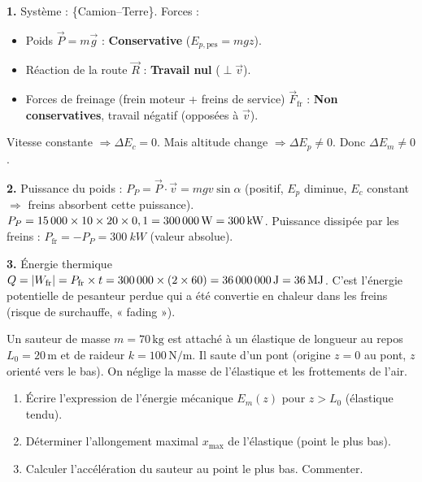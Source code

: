 \documentclass[11pt]{article}
\begin{document}
\begin{corrige}
\textbf{1.} Système : \{Camion–Terre\}. Forces :
\begin{itemize}
    \item Poids $\vec{P} = m\vec{g}$ : \textbf{Conservative} ($E_{p,\text{pes}} = mgz$).
    \item Réaction de la route $\vec{R}$ : \textbf{Travail nul} ($\perp \vec{v}$).
    \item Forces de freinage (frein moteur + freins de service) $\vec{F}_{\text{fr}}$ : \textbf{Non conservatives}, travail négatif (opposées à $\vec{v}$).
\end{itemize}
Vitesse constante $\Rightarrow \Delta E_c = 0$. Mais altitude change $\Rightarrow \Delta E_p \neq 0$. Donc $\Delta E_m \neq 0$.

\textbf{2.} Puissance du poids : $P_P = \vec{P} \cdot \vec{v} = mgv\sin\alpha$ (positif, $E_p$ diminue, $E_c$ constant $\Rightarrow$ freins absorbent cette puissance).
$P_P = 15\,000 \times 10 \times 20 \times 0,1 = \SI{300\,000}{W} = \SI{300}{kW}$.
Puissance dissipée par les freins : $P_{\text{fr}} = -P_P = \SI{300}{kW}$ (valeur absolue).

\textbf{3.} Énergie thermique $Q = |W_{\text{fr}}| = P_{\text{fr}} \times t = 300\,000 \times (2 \times 60) = \SI{36\,000\,000}{J} = \SI{36}{MJ}$.
C'est l'énergie potentielle de pesanteur perdue qui a été convertie en chaleur dans les freins (risque de surchauffe, « fading »).
\end{corrige}

\begin{exercice}
Un sauteur de masse $m = 70\,\text{kg}$ est attaché à un élastique de longueur au repos $L_0 = 20\,\text{m}$ et de raideur $k = 100\,\text{N/m}$. Il saute d'un pont (origine $z=0$ au pont, $z$ orienté vers le bas). On néglige la masse de l'élastique et les frottements de l'air.
\begin{enumerate}
    \item Écrire l'expression de l'énergie mécanique $E_m(z)$ pour $z > L_0$ (élastique tendu).
    \item Déterminer l'allongement maximal $x_{\text{max}}$ de l'élastique (point le plus bas).
    \item Calculer l'accélération du sauteur au point le plus bas. Commenter.
\end{enumerate}
\end{exercice}
\end{document}
